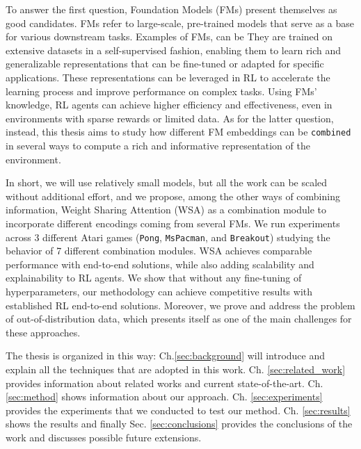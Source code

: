 To answer the first question, Foundation Models (FMs) present themselves as good candidates.
FMs refer to large-scale, pre-trained models that serve as a base for various downstream tasks.
Examples of FMs, can be \citet{brown2020language, devlin2018bert, he2016deep}
They are trained on extensive datasets in a self-supervised fashion, enabling them to learn rich and generalizable representations that can be fine-tuned or adapted for specific applications. 
These representations can be leveraged in RL to accelerate the learning process and improve performance on complex tasks. Using FMs' knowledge, RL agents can achieve higher efficiency and effectiveness, even in environments with sparse rewards or limited data. 
As for the latter question, instead, this thesis aims to study how different FM embeddings can be \texttt{combined} in several ways to compute a rich and informative representation of the environment. 


In short, we will use relatively small models, but all the work can be scaled without additional effort, and we propose, among the other ways of combining information, Weight Sharing Attention (WSA) as a combination module to incorporate different encodings coming from several FMs.
We run experiments across 3 different Atari games (\texttt{Pong}, \texttt{MsPacman}, and \texttt{Breakout}) studying the behavior of 7 different combination modules.
WSA achieves comparable performance with end-to-end solutions, while also adding scalability and explainability to RL agents.
We show that without any fine-tuning of hyperparameters, our methodology can achieve competitive results with established RL end-to-end solutions. Moreover, we prove and address the problem of out-of-distribution data, which presents itself as one of the main challenges for these approaches. 


The thesis is organized in this way: Ch.\ref{sec:background} will introduce and explain all the techniques that are adopted in this work. Ch. \ref{sec:related_work} provides information about related works and current state-of-the-art. Ch. \ref{sec:method} shows information about our approach. Ch. \ref{sec:experiments} provides the experiments that we conducted to test our method. Ch. \ref{sec:results} shows the results and finally Sec. \ref{sec:conclusions} provides the conclusions of the work and discusses possible future extensions.
